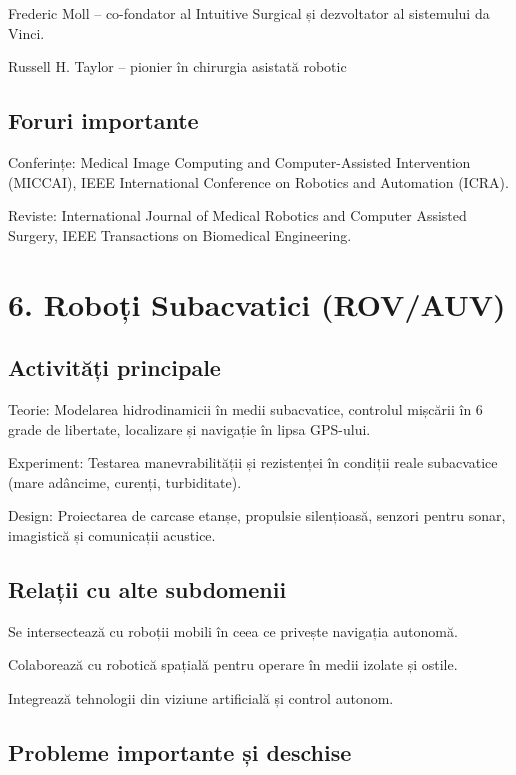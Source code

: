 \documentclass[12pt]{article}
\begin{document}
Frederic Moll – co-fondator al Intuitive Surgical și dezvoltator al sistemului da Vinci.

Russell H. Taylor – pionier în chirurgia asistată robotic

\subsection*{Foruri importante}

Conferințe: Medical Image Computing and Computer-Assisted Intervention (MICCAI), IEEE International Conference on Robotics and Automation (ICRA).

Reviste: International Journal of Medical Robotics and Computer Assisted Surgery, IEEE Transactions on Biomedical Engineering.

\section{6. Roboți Subacvatici (ROV/AUV)}

\subsection*{Activități principale}

Teorie:
Modelarea hidrodinamicii în medii subacvatice, controlul mișcării în 6 grade de libertate, localizare și navigație în lipsa GPS-ului.

Experiment:
Testarea manevrabilității și rezistenței în condiții reale subacvatice (mare adâncime, curenți, turbiditate).

Design:
Proiectarea de carcase etanșe, propulsie silențioasă, senzori pentru sonar, imagistică și comunicații acustice.

\subsection*{Relații cu alte subdomenii}

Se intersectează cu roboții mobili în ceea ce privește navigația autonomă.

Colaborează cu robotică spațială pentru operare în medii izolate și ostile.

Integrează tehnologii din viziune artificială și control autonom.

\subsection*{Probleme importante și deschise}
\end{document}
